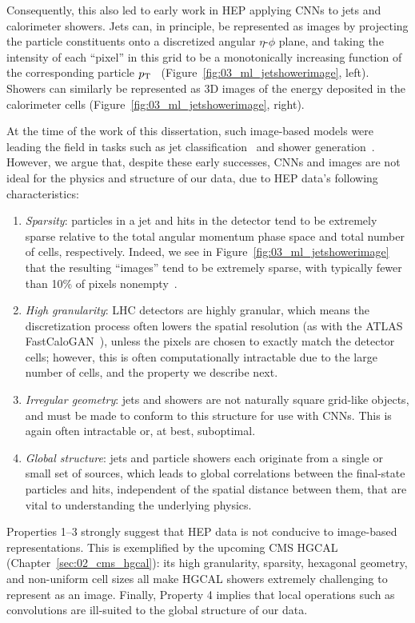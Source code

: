Consequently, this also led to early work in HEP applying CNNs to jets and calorimeter showers.
Jets can, in principle, be represented as images by projecting the particle constituents onto a discretized angular $\eta$-$\phi$ plane, and taking the intensity of each ``pixel'' in this grid to be a monotonically increasing function of the corresponding particle $p_\mathrm{T}$~\cite{deOliveira:2015xxd} (Figure~\ref{fig:03_ml_jetshowerimage}, left). 
Showers can similarly be represented as 3D images of the energy deposited in the calorimeter cells (Figure~\ref{fig:03_ml_jetshowerimage}, right).

At the time of the work of this dissertation, such image-based models were leading the field in tasks such as jet classification~\cite{CMS:2020poo} and shower generation~\cite{ATL-SOFT-PUB-2018-001}.
However, we argue that, despite these early successes, CNNs and images are not ideal for the physics and structure of our data, due to HEP data's following characteristics:
\begin{enumerate}
    \item \textit{Sparsity}: particles in a jet and hits in the detector tend to be extremely sparse relative to the total angular momentum phase space and total number of cells, respectively.
    Indeed, we see in Figure~\ref{fig:03_ml_jetshowerimage} that the resulting ``images'' tend to be extremely sparse, with typically fewer than 10\% of pixels nonempty~\cite{Qu:2019gqs}.
    \item \textit{High granularity}: LHC detectors are highly granular, which means the discretization process often lowers the spatial resolution (as with the ATLAS FastCaloGAN~\cite{ATL-SOFT-PUB-2018-001}), unless the pixels are chosen to exactly match the detector cells; however, this is often computationally intractable due to the large number of cells, and the property we describe next.
    \item \textit{Irregular geometry}: jets and showers are not naturally square grid-like objects, and must be made to conform to this structure for use with CNNs.
    This is again often intractable or, at best, suboptimal.
    \item \textit{Global structure}: jets and particle showers each originate from a single or small set of sources, which leads to global correlations between the final-state particles and hits, independent of the spatial distance between them, that are vital to understanding the underlying physics.
\end{enumerate}
Properties 1--3 strongly suggest that HEP data is not conducive to image-based representations.
This is exemplified by the upcoming CMS HGCAL (Chapter~\ref{sec:02_cms_hgcal}): its high granularity, sparsity, hexagonal geometry, and non-uniform cell sizes all make HGCAL showers extremely challenging to represent as an image.
Finally, Property 4 implies that local operations such as convolutions are ill-suited to the global structure of our data.

